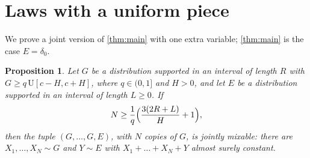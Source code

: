 ﻿\documentclass[11pt]{amsart}
\newtheorem{proposition}[theorem]{Proposition}
\theoremstyle{remark}
\newcommand{\U}{\mathrm{U}}
\begin{document}
\section{Laws with a uniform piece}

We prove a joint version of \cref{thm:main} with one extra variable; \cref{thm:main} is the case $E=\delta_0$.

\begin{proposition}\label{prop:joint}
Let $G$ be a distribution supported in an interval of length $R$ with $G\ge q\,\U[c-H,c+H]$, where $q\in(0,1]$ and $H>0$, and let $E$ be a distribution supported in an interval of length $L\ge0$. If
\[
N\ge\frac1q\Bigl(\frac{3(2R+L)}{H}+1\Bigr),
\]
then the tuple $(G,\dots,G,E)$, with $N$ copies of $G$, is jointly mixable: there are $X_1,\dots,X_N\sim G$ and $Y\sim E$ with $X_1+\dots+X_N+Y$ almost surely constant.
\end{proposition}
\end{document}
